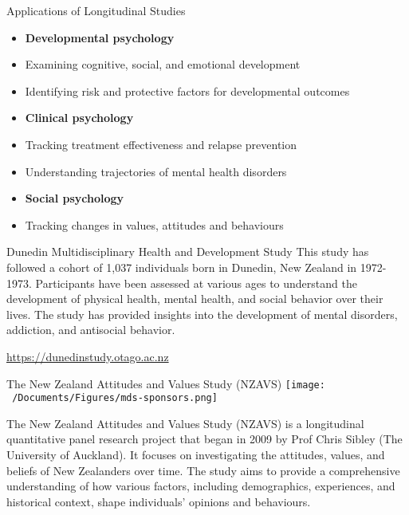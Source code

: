 \documentclass[
  ignorenonframetext,
  aspectratio=169,
]{beamer}
\providecommand{\tightlist}{%
  \setlength{\itemsep}{0pt}\setlength{\parskip}{0pt}}\usepackage{longtable,booktabs,array}
\begin{document}
\begin{frame}{Applications of Longitudinal Studies}
\label{applications-of-longitudinal-studies}
\begin{itemize}[<+->]
\tightlist
\item
  \textbf{Developmental psychology}
\item
  Examining cognitive, social, and emotional development
\item
  Identifying risk and protective factors for developmental outcomes
\item
  \textbf{Clinical psychology}
\item
  Tracking treatment effectiveness and relapse prevention
\item
  Understanding trajectories of mental health disorders
\item
  \textbf{Social psychology}
\item
  Tracking changes in values, attitudes and behaviours
\end{itemize}
\end{frame}

\begin{frame}{Dunedin Multidisciplinary Health and Development Study}
\label{dunedin-multidisciplinary-health-and-development-study}
This study has followed a cohort of 1,037 individuals born in Dunedin,
New Zealand in 1972-1973. Participants have been assessed at various
ages to understand the development of physical health, mental health,
and social behavior over their lives. The study has provided insights
into the development of mental disorders, addiction, and antisocial
behavior.

\url{https://dunedinstudy.otago.ac.nz}
\end{frame}

\begin{frame}{The New Zealand Attitudes and Values Study (NZAVS)}
\label{the-new-zealand-attitudes-and-values-study-nzavs}
\texttt{[image: ~/Documents/Figures/mds-sponsors.png]}
\end{frame}

\begin{frame}
The New Zealand Attitudes and Values Study (NZAVS) is a longitudinal
quantitative panel research project that began in 2009 by Prof Chris
Sibley (The University of Auckland). It focuses on investigating the
attitudes, values, and beliefs of New Zealanders over time. The study
aims to provide a comprehensive understanding of how various factors,
including demographics, experiences, and historical context, shape
individuals' opinions and behaviours.
\end{frame}
\end{document}
